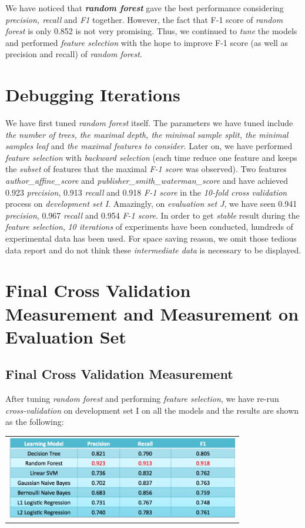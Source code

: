 \documentclass[10pt, oneside]{article}
\begin{document}
\noindent
We have noticed that \textbf{\textit{random forest}} gave the best performance considering \textit{precision, recall}  and \textit{F1} together. However,  the fact
that F-1 score of \textit{random forest} is only 0.852 is not very promising. Thus, we continued to \textit{tune} the models and performed \textit{feature selection}
with the hope to improve F-1 score (as well as precision and recall) of \textit{random forest}.
 
\section*{Debugging Iterations}
We have first tuned \textit{random forest} itself. The parameters we have tuned include \textit{the number of trees, the maximal depth, the minimal sample split, the minimal samples leaf} and \textit{the maximal features to consider}.
Later on, we have performed \textit{feature selection} with \textit{backward selection} (each time reduce one feature and keeps the \textit{subset} of features that the maximal \textit{F-1 score} was observed). Two features 
\textit{author\_affine\_score} and \textit{publisher\_smith\_waterman\_score} and have achieved 0.923 \textit{precision}, 0.913 \textit{recall} and 0.918 \textit{F-1 score} in the \textit{10-fold cross validation} process on \textit{development set I}. Amazingly, on \textit{evaluation set J}, we have seen 0.941 \textit{precision}, 0.967 \textit{recall} and 0.954 \textit{F-1 score}. In order to get \textit{stable} result during the \textit{feature selection}, \textit{10 iterations} of experiments have been conducted, hundreds of experimental data has been used. For space saving reason, we omit those tedious data report and do not think these \textit{intermediate data} is necessary to be displayed.

\section*{Final Cross Validation Measurement and Measurement on Evaluation Set}
\subsection*{Final Cross Validation Measurement}
After tuning \textit{random forest} and performing \textit{feature selection}, we have re-run \textit{cross-validation} on development set I on all the models and the results are shown
as the following:
\begin{table}[H]
\begin{tabular}{c}
\includegraphics[width=4in]{final_cv_score}
\end{tabular}
\end{table}
\end{document}
